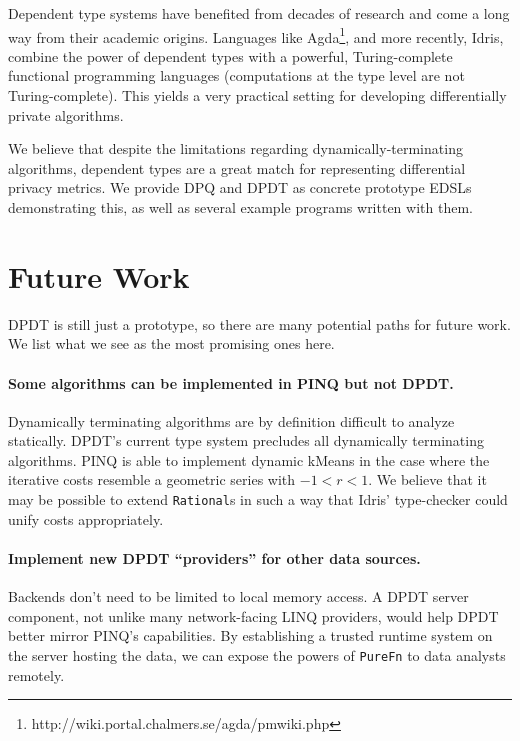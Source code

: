 \documentclass[12pt]{report}
\begin{document}
Dependent type systems have benefited from decades of research and come a long way from their academic origins.
Languages like Agda\footnote{http://wiki.portal.chalmers.se/agda/pmwiki.php}, and more recently, Idris, combine the power of dependent types with a powerful, Turing-complete functional programming languages (computations at the type level are not Turing-complete).
This yields a very practical setting for developing differentially private algorithms.

We believe that despite the limitations regarding dynamically-terminating algorithms, dependent types are a great match for representing differential privacy metrics.
We provide DPQ and DPDT as concrete prototype EDSLs demonstrating this, as well as several example programs written with them.

\section{Future Work}\label{sec:future_work}

DPDT is still just a prototype, so there are many potential paths for future work.
We list what we see as the most promising ones here.

\paragraph{Some algorithms can be implemented in PINQ but not DPDT.}
Dynamically terminating algorithms are by definition difficult to analyze statically.
DPDT's current type system precludes all dynamically terminating algorithms.
PINQ is able to implement dynamic kMeans in the case where the iterative costs resemble a geometric series with $-1 < r < 1$.
We believe that it may be possible to extend \texttt{Rational}s in such a way that Idris' type-checker could unify costs appropriately.

\paragraph{Implement new DPDT ``providers'' for other data sources.}
Backends don't need to be limited to local memory access.
A DPDT server component, not unlike many network-facing LINQ providers, would help DPDT better mirror PINQ's capabilities.
By establishing a trusted runtime system on the server hosting the data, we can expose the powers of \texttt{PureFn} to data analysts remotely.

\end{document}
